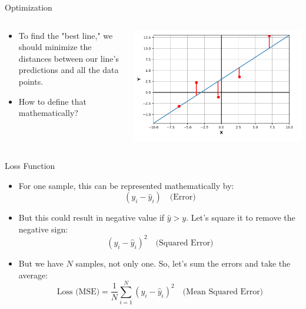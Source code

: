 \begin{frame}{Optimization}
    \begin{columns}
        \begin{column}{0.45\textwidth}
            \begin{itemize}
                \item To find the "best line," we should minimize the distances between our line’s predictions and all the data points.
                \item How to define that mathematically?
            \end{itemize}
        \end{column}
        \begin{column}{0.55\textwidth}
            \includegraphics[width=\linewidth]{images/linear-regression/linear-regression-7.png}
        \end{column}
    \end{columns}
\end{frame}


\begin{frame}{Loss Function}
    \begin{itemize}
        \item For one sample, this can be represented mathematically by:
        \[
            (y_i - \hat{y}_i) \quad \text{(Error)}
        \]
        
        \item But this could result in negative value if $\hat{y} > y$. Let’s square it to remove the negative sign:
        \[
            (y_i - \hat{y}_i)^2 \quad \text{(Squared Error)}
        \]

        \item But we have $N$ samples, not only one. So, let’s sum the errors and take the average:
        \[
            \boxed{
                \text{Loss (MSE)} = \frac{1}{N} \sum_{i=1}^{N} (y_i - \hat{y}_i)^2
            }
            \quad \text{(Mean Squared Error)}
        \]
    \end{itemize}
\end{frame}


